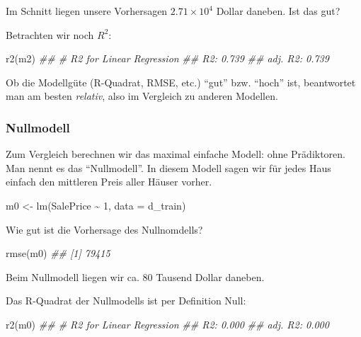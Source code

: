 \documentclass[
  letterpaper,
]{scrbook}
\newenvironment{Shaded}{\begin{snugshade}}{\end{snugshade}}
\newcommand{\AttributeTok}[1]{\textcolor[rgb]{0.40,0.45,0.13}{#1}}
\newcommand{\DecValTok}[1]{\textcolor[rgb]{0.68,0.00,0.00}{#1}}
\newcommand{\DocumentationTok}[1]{\textcolor[rgb]{0.37,0.37,0.37}{\textit{#1}}}
\newcommand{\FunctionTok}[1]{\textcolor[rgb]{0.28,0.35,0.67}{#1}}
\newcommand{\NormalTok}[1]{\textcolor[rgb]{0.00,0.23,0.31}{#1}}
\newcommand{\OtherTok}[1]{\textcolor[rgb]{0.00,0.23,0.31}{#1}}
\newcommand{\SpecialCharTok}[1]{\textcolor[rgb]{0.37,0.37,0.37}{#1}}
\theoremstyle{definition}
\theoremstyle{definition}
\theoremstyle{definition}
\theoremstyle{remark}
\begin{document}
Im Schnitt liegen unsere Vorhersagen \ensuremath{2.71\times 10^{4}}
Dollar daneben. Ist das gut?

Betrachten wir noch \(R^2\):

\begin{Shaded}
\begin{Highlighting}[]
\FunctionTok{r2}\NormalTok{(m2)}
\DocumentationTok{\#\# \# R2 for Linear Regression}
\DocumentationTok{\#\#        R2: 0.739}
\DocumentationTok{\#\#   adj. R2: 0.739}
\end{Highlighting}
\end{Shaded}

Ob die Modellgüte (R-Quadrat, RMSE, etc.) \enquote{gut} bzw.
\enquote{hoch} ist, beantwortet man am besten \emph{relativ}, also im
Vergleich zu anderen Modellen.

\subsubsection{Nullmodell}\label{nullmodell}

Zum Vergleich berechnen wir das maximal einfache Modell: ohne
Prädiktoren. Man nennt es das \enquote{Nullmodell}. In diesem Modell
sagen wir für jedes Haus einfach den mittleren Preis aller Häuser
vorher.

\begin{Shaded}
\begin{Highlighting}[]
\NormalTok{m0 }\OtherTok{\textless{}{-}} \FunctionTok{lm}\NormalTok{(SalePrice }\SpecialCharTok{\textasciitilde{}} \DecValTok{1}\NormalTok{, }\AttributeTok{data =}\NormalTok{ d\_train)}
\end{Highlighting}
\end{Shaded}

Wie gut ist die Vorhersage des Nullnomdells?

\begin{Shaded}
\begin{Highlighting}[]
\FunctionTok{rmse}\NormalTok{(m0)}
\DocumentationTok{\#\# [1] 79415}
\end{Highlighting}
\end{Shaded}

Beim Nullmodell liegen wir ca. 80 Tausend Dollar daneben.

Das R-Quadrat der Nullmodells ist per Definition Null:

\begin{Shaded}
\begin{Highlighting}[]
\FunctionTok{r2}\NormalTok{(m0)}
\DocumentationTok{\#\# \# R2 for Linear Regression}
\DocumentationTok{\#\#        R2: 0.000}
\DocumentationTok{\#\#   adj. R2: 0.000}
\end{Highlighting}
\end{Shaded}
\end{document}
